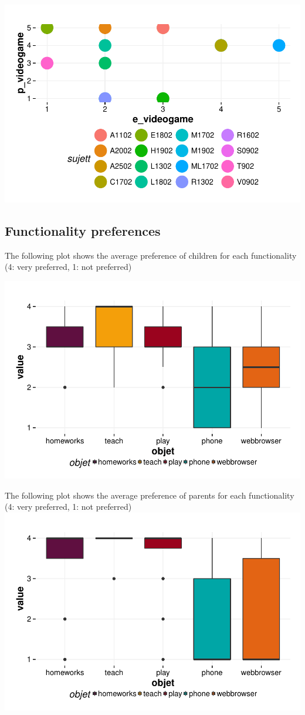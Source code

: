 \documentclass{article}
\begin{document}
\includegraphics{interviews-plot_coirs_parent_enfant_videogame}

\subsection{Functionality preferences}

The following plot shows the average preference of children for each functionality (4: very preferred, 1: not preferred)

\includegraphics{interviews-plot_functionality_child}

The following plot shows the average preference of parents for each functionality (4: very preferred, 1: not preferred)
\includegraphics{interviews-plot_functionality_parent}
\end{document}
